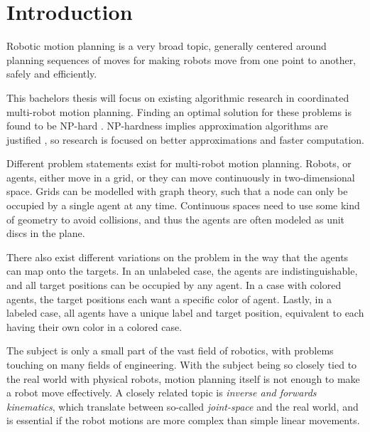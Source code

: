 \section{Introduction}

Robotic motion planning is a very broad topic, generally centered around planning sequences of moves for making robots move from one point to another, safely and efficiently. 

This bachelors thesis will focus on existing algorithmic research in coordinated multi-robot motion planning.
Finding an optimal solution for these problems is found to be NP-hard \cite{demaine_coordinated_2019}. NP-hardness implies approximation algorithms are justified \cite{demaine_coordinated_2019}, so research is focused on better approximations and faster computation. 

Different problem statements exist for multi-robot motion planning. Robots, or agents, either move in a grid, or they can move continuously in two-dimensional space. 
Grids can be modelled with graph theory, such that a node can only be occupied by a single agent at any time. 
Continuous spaces need to use some kind of geometry to avoid collisions, and thus the agents are often modeled as unit discs in the plane. 

There also exist different variations on the problem in the way that the agents can map onto the targets. In an unlabeled case, the agents are indistinguishable, and all target positions can be occupied by any agent. In a case with colored agents, the target positions each want a specific color of agent. Lastly, in a labeled case, all agents have a unique label and target position, equivalent to each having their own color in a colored case.

The subject is only a small part of the vast field of robotics, with problems touching on many fields of engineering. 
With the subject being so closely tied to the real world with physical robots, motion planning itself is not enough to make a robot move effectively. 
A closely related topic is \emph{inverse and forwards kinematics}, which translate between so-called \emph{joint-space} and the real world, and is essential if the robot motions are more complex than simple linear movements. 


